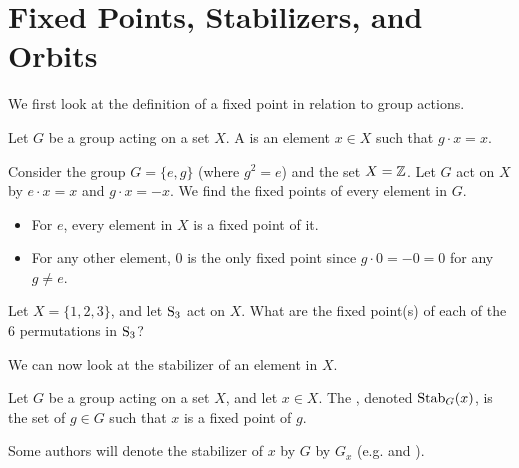 \newpage

\section{Fixed Points, Stabilizers, and Orbits}
We first look at the definition of a fixed point in relation to group actions.

\begin{definition}
    Let $G$ be a group acting on a set $X$. A  is an element $x \in X$ such that $g\cdot x = x$.
\end{definition}

\begin{example}
    Consider the group $G = \{e, g\}$ (where $g^2 = e$) and the set $X = \mathbb{Z}$. Let $G$ act on $X$ by $e\cdot x = x$ and $g\cdot x = -x$. We find the fixed points of every element in $G$.
    \begin{itemize}
        \item For $e$, every element in $X$ is a fixed point of it.
        \item For any other element, 0 is the only fixed point since $g\cdot 0 = -0 = 0$ for any $g \neq e$.
    \end{itemize}
\end{example}

\begin{exercise}
    Let $X = \{1, 2, 3\}$, and let $\mathrm{S}_{3}$ act on $X$. What are the fixed point(s) of each of the 6 permutations in $\mathrm{S}_{3}$?
\end{exercise}

We can now look at the stabilizer of an element in $X$.

\begin{definition}
    Let $G$ be a group acting on a set $X$, and let $x \in X$. The , denoted $\mathrm{Stab}_{G}(x)$, is the set of $g \in G$ such that $x$ is a fixed point of $g$.
\end{definition}
\begin{remark}
    Some authors will denote the stabilizer of $x$ by $G$ by $G_x$ (e.g. {\cite[\S 54]{clark_1984}} and {\cite[Definition 10.8]{humphreys_1996}}).
\end{remark}

